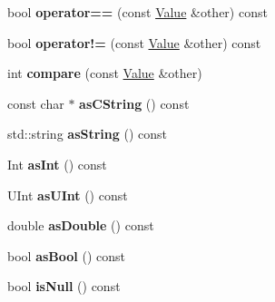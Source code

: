 \begin{DoxyCompactItemize}
\item 
\hypertarget{class_json_1_1_value_a593ffc8716f4950dfd404f8589994976}{bool {\bfseries operator==} (const \hyperlink{class_json_1_1_value}{Value} \&other) const }\label{class_json_1_1_value_a593ffc8716f4950dfd404f8589994976}

\item 
\hypertarget{class_json_1_1_value_a0d4b1c3a4a5b2c2ef50ca3fb6279fc1b}{bool {\bfseries operator!=} (const \hyperlink{class_json_1_1_value}{Value} \&other) const }\label{class_json_1_1_value_a0d4b1c3a4a5b2c2ef50ca3fb6279fc1b}

\item 
\hypertarget{class_json_1_1_value_a12680b9e9c7d19ebc7937b62ae170764}{int {\bfseries compare} (const \hyperlink{class_json_1_1_value}{Value} \&other)}\label{class_json_1_1_value_a12680b9e9c7d19ebc7937b62ae170764}

\item 
\hypertarget{class_json_1_1_value_aeb6ef12f8826cfb9e550f2dfa56dedfb}{const char $\ast$ {\bfseries as\+C\+String} () const }\label{class_json_1_1_value_aeb6ef12f8826cfb9e550f2dfa56dedfb}

\item 
\hypertarget{class_json_1_1_value_a654aca2279dddbcdcb091fbb514314d6}{std\+::string {\bfseries as\+String} () const }\label{class_json_1_1_value_a654aca2279dddbcdcb091fbb514314d6}

\item 
\hypertarget{class_json_1_1_value_ae614dfda7baf23091b3828bd085c1568}{Int {\bfseries as\+Int} () const }\label{class_json_1_1_value_ae614dfda7baf23091b3828bd085c1568}

\item 
\hypertarget{class_json_1_1_value_a0e13be84490fdf135f8abb5b7d8f14ac}{U\+Int {\bfseries as\+U\+Int} () const }\label{class_json_1_1_value_a0e13be84490fdf135f8abb5b7d8f14ac}

\item 
\hypertarget{class_json_1_1_value_ab9e4dc8e42a3999346b7a50c2de784aa}{double {\bfseries as\+Double} () const }\label{class_json_1_1_value_ab9e4dc8e42a3999346b7a50c2de784aa}

\item 
\hypertarget{class_json_1_1_value_a69a74b966b98f5bbfd9031d814c7e182}{bool {\bfseries as\+Bool} () const }\label{class_json_1_1_value_a69a74b966b98f5bbfd9031d814c7e182}

\item 
\hypertarget{class_json_1_1_value_ae66a7e757a31b6e25e03acc7cb01db2c}{bool {\bfseries is\+Null} () const }\label{class_json_1_1_value_ae66a7e757a31b6e25e03acc7cb01db2c}


\end{DoxyCompactItemize}

